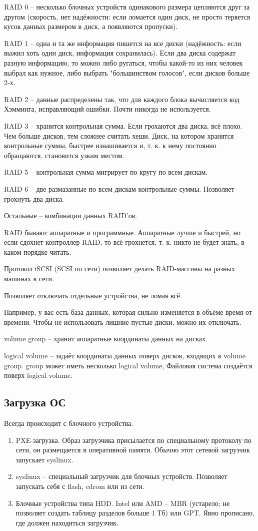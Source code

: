\documentclass[a4paper,10pt]{article}
\begin{document}
RAID 0 -- несколько блочных устройств одинакового размера цепляются друг за другом (скорость, нет надёжности: если ломается один диск, не просто теряется кусок данных размером в диск, а появляются пропуски).

RAID 1 -- одна и та же информация пишется на все диски (надёжность: если выжил хоть один диск, информация сохранилась). Если два диска содержат разную информацию, то можно либо ругаться, чтобы какой-то из них человек выбрал как нужное, либо выбрать "большинством голосов", если дисков больше 2-х.

RAID 2 -- данные распределены так, что для каждого блока вычисляется код Хэмминга, исправляющий ошибки. Почти никогда не используется.

RAID 3 -- хранится контрольная сумма. Если грохаются два диска, всё плохо. Чем больше дисков, тем сложнее считать хеши. Диск, на котором хранятся контрольные суммы, быстрее изнашивается и, т. к. к нему постоянно обращаются, становится узким местом.

RAID 5 -- контрольная сумма мигрирует по кругу по всем дискам.

RAID 6 -- две размазанные по всем дискам контрольные суммы. Позволяет грохнуть два диска.

Остальные -- комбинации данных RAID'ов.

RAID бывают аппаратные и программные. Аппаратные лучше и быстрей, но если сдохнет контроллер RAID, то всё грохнется, т. к. никто не будет знать, в каком порядке читать. 

Протокол iSCSI (SCSI по сети) позволяет делать RAID-массивы на разных машинах в сети.

Позволяет отключать отдельные устройства, не ломая всё.

Например, у вас есть база данных, которая сильно изменяется в объёме время от времени. Чтобы не использовать лишние пустые диски, можно их отключать.

volume group -- хранит аппаратные координаты данных на дисках.

logical volume -- задаёт координаты данных поверх дисков, входящих в volume group. group может иметь несколько logical volume, Файловая система создаётся поверх logical volume.

\subsection{Загрузка ОС}
Всегда происходит с блочного устройства. 
\begin{enumerate}
\item PXE-загрузка. Образ загрузчика присылается по специальному протоколу по сети, он размещается в оперативной памяти. Обычно этот сетевой загрузчик запускает syslinux.
\item syslinux -- специальный загрузчик для блочных устройств.
Позволяет запускать себя с flash, cdrom или из сети.
\item Блочные устройства типа HDD. Intel или AMD  -- MBR (устарело; не позволяет создать таблицу разделов больше 1 Тб) или GPT. Явно прописано, где должен находиться загрузчик. 
\end{enumerate}
\end{document}
